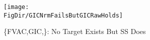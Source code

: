 \begin{figure}[tbp]
\centerline{\texttt{[image: \\FigDir/GICNrmFailsButGICRawHolds]}}
\caption{\{{FVAC},{GIC},\}: No Target Exists But SS Does}
\label{fig:GICNrmFailsButGICRawHolds}
\end{figure}
